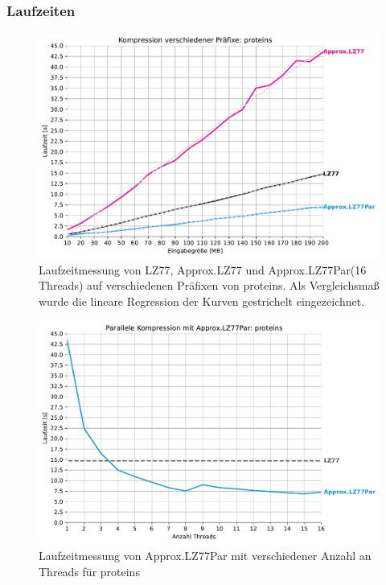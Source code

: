 \subsubsection{Laufzeiten}
\begin{figure}[ht]
    \centering
    \caption{Laufzeitmessung von LZ77, Approx.LZ77 und Approx.LZ77Par(16 Threads) auf verschiedenen Präfixen von proteins. Als Vergleichsmaß wurde 
    die lineare Regression der Kurven gestrichelt eingezeichnet.}
    \label{runtime}
    \includegraphics[scale=0.6]{Images/progressive_proteins.pdf}
\end{figure}
    
\begin{figure}[ht]
    \centering
    \caption{Laufzeitmessung von Approx.LZ77Par mit verschiedener Anzahl an Threads für proteins}
    \label{runtime_threads}
    \includegraphics[scale=0.6]{Images/progressive_speedup_proteins.pdf}
\end{figure}

